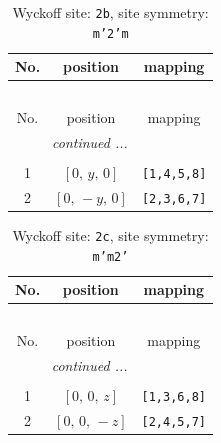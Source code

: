 \documentclass[fleqn,8pt]{jsarticle}
\begin{document}
\begin{longtable}{ccc}
\caption{Wyckoff site: {\tt 2b}, site symmetry: {\tt m'2'm}}
 \\
 \hline \hline
No. & position & mapping \\ \hline \endfirsthead

\multicolumn{2}{l}{\tablename\ \thetable{}} \\
 \hline \hline
No. & position & mapping \\ \hline \endhead

 \hline \hline
\multicolumn{2}{r}{\footnotesize\it continued ...} \\ \endfoot

 \hline \hline
\multicolumn{2}{r}{} \\ \endlastfoot

1 & $\left[ 0,\, y,\, 0 \right]$ & {\tt [1,4,5,8]} \\ \hline
2 & $\left[ 0,\, - y,\, 0 \right]$ & {\tt [2,3,6,7]} \\
\end{longtable}
\renewcommand{\arraystretch}{1.2}
\begin{longtable}{ccc}
\caption{Wyckoff site: {\tt 2c}, site symmetry: {\tt m'm2'}}
 \\
 \hline \hline
No. & position & mapping \\ \hline \endfirsthead

\multicolumn{2}{l}{\tablename\ \thetable{}} \\
 \hline \hline
No. & position & mapping \\ \hline \endhead

 \hline \hline
\multicolumn{2}{r}{\footnotesize\it continued ...} \\ \endfoot

 \hline \hline
\multicolumn{2}{r}{} \\ \endlastfoot

1 & $\left[ 0,\, 0,\, z \right]$ & {\tt [1,3,6,8]} \\ \hline
2 & $\left[ 0,\, 0,\, - z \right]$ & {\tt [2,4,5,7]} \\
\end{longtable}
\renewcommand{\arraystretch}{1.2}
\end{document}
